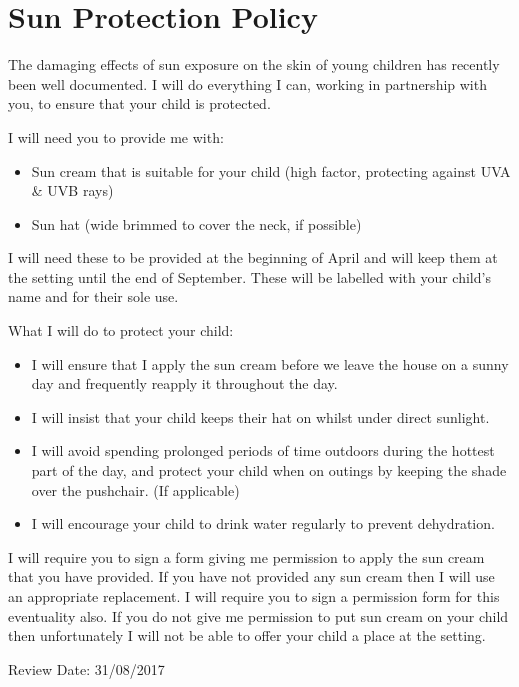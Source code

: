 

\section{Sun Protection Policy}

The damaging effects of sun exposure on the skin of young children has recently been well documented. I will do everything I can, working in partnership with you, to ensure that your child is protected.

I will need you to provide me with:
\begin{itemize}
\item Sun cream that is suitable for your child (high factor, protecting against UVA \& UVB rays)
\item Sun hat (wide brimmed to cover the neck, if possible)
\end{itemize}

I will need these to be provided at the beginning of April and will keep them at the setting until the end of September. These will be labelled with your child's name and for their sole use.

What I will do to protect your child:

\begin{itemize}
\item I will ensure that I apply the sun cream before we leave the house on a sunny day and frequently reapply it throughout the day. 
\item I will insist that your child keeps their hat on whilst under direct sunlight. 
\item I will avoid spending prolonged periods of time outdoors during the hottest part of the day, and protect your child when on outings by keeping the shade over the pushchair. (If applicable) 
\item I will encourage your child to drink water regularly to prevent dehydration. 
\end{itemize}

I will require you to sign a form giving me permission to apply the sun cream that you have provided. If you have not provided any sun cream then I will use an appropriate replacement. I will require you to sign a permission form for this eventuality also. If you do not give me permission to put sun cream on your child then unfortunately I will not be able to offer your child a place at the setting.

Review Date: 31/08/2017


